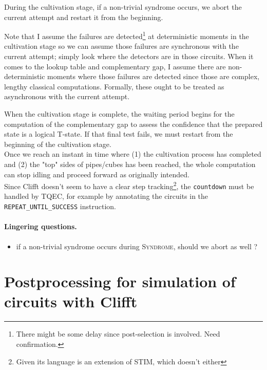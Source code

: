 \documentclass{article}
\begin{document}
	During the cultivation stage, if a non-trivial syndrome occurs, we abort the current attempt and restart it from the beginning.

	Note that I assume the failures are detected\footnote{There might be some delay since post-selection is involved. Need confirmation.} at deterministic moments in the cultivation stage so we can assume those failures are synchronous with the current attempt; simply look where the detectors are in those circuits. When it comes to the lookup table and complementary gap, I assume there are non-deterministic moments where those failures are detected since those are complex, lengthy classical computations. Formally, these ought to be treated as asynchronous with the current attempt.

	When the cultivation stage is complete, the waiting period begins for the computation of the complementary gap to assess the confidence that the prepared state is a logical T-state. If that final test fails, we must restart from the beginning of the cultivation stage. \\

	Once we reach an instant in time where (1) the cultivation process has completed and (2) the "top" sides of pipes/cubes has been reached, the whole computation can stop idling and proceed forward as originally intended. \\

	Since Clifft doesn't seem to have a clear step tracking\footnote{Given its language is an extension of STIM, which doesn't either}, the {\tt countdown} must be handled by TQEC, for example by annotating the circuits in the {\tt REPEAT\_UNTIL\_SUCCESS} instruction.

	\paragraph{Lingering questions.}
	
	\begin{itemize}
		\item if a non-trivial syndrome occurs during \textsc{Syndrome}, should we abort as well ?
	\end{itemize}

	\newpage

	\section{Postprocessing for simulation of circuits with Clifft}
\end{document}
